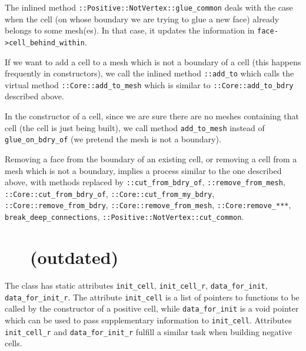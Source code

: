 The inlined method {\small\tt {}::Positive::NotVertex::glue\_common} deals with
the case when the cell (on whose boundary we are trying to glue a new face)
already belongs to some mesh(es).
In that case, it updates the information in {\small\tt face->cell\_behind\_within}.

If we want to add a cell to a mesh which is not a boundary of a cell (this happens
frequently in {\small\tt {}} constructors),
we call the inlined method {\small\tt {}::add\_to} which calls the virtual method
{\small\tt {}::Core::add\_to\_mesh} which is similar to {\small\tt {}::Core::add\_to\_bdry}
described above.

In the constructor of a cell, since we are sure there are no meshes containing that cell
(the cell is just being built),
we call method {\small\tt add\_to\_mesh} instead of {\small\tt glue\_on\_bdry\_of}
(we pretend the mesh is not a boundary).

Removing a face from the boundary of an existing cell, or removing a cell from a mesh
which is not a boundary, implies a process similar to the one described above,
with methods replaced by {\small\tt {}::cut\_from\_bdry\_of},
{\small\tt {}::remove\_from\_mesh},
{\small\tt {}::Core::cut\_from\_bdry\_of},
{\small\tt {}::Core::cut\_from\_my\_bdry},
{\small\tt {}::Core::remove\_from\_bdry}, {\small\tt {}::Core::remove\_from\_mesh},
{\small\tt {}::Core:remove\_***}, {\small\tt break\_deep\_connections},
{\small\tt {}::Positive::NotVertex::cut\_common}.


\section{~~ (outdated)}\label{\numb section 11.\numb parag 10}

The {\small\tt {}} class has static attributes {\small\tt init\_cell},
{\small\tt init\_cell\_r}, {\small\tt data\_for\_init}, {\small\tt data\_for\_init\_r}.
The attribute {\small\tt init\_cell} is a list of pointers to functions to be called by
the constructor of a positive cell, while {\small\tt data\_for\_init} is a void pointer which
can be used to pass supplementary information to {\small\tt init\_cell}.
Attributes {\small\tt init\_cell\_r} and {\small\tt data\_for\_init\_r} fulfill a similar task
when building negative cells.

